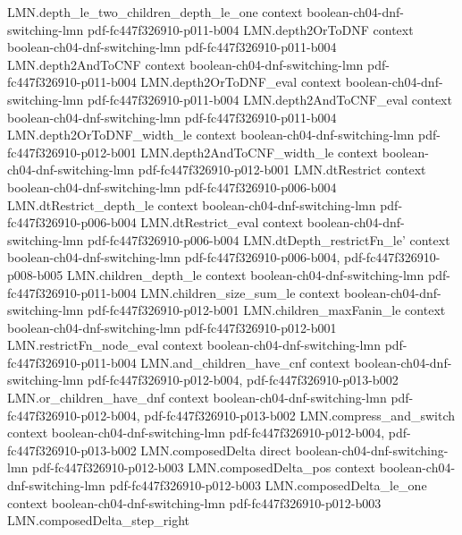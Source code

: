 \begin{theorem}
\proofstep
  {LMN.depth_le_two_children_depth_le_one}
  {context}
  {boolean-ch04-dnf-switching-lmn}
  {pdf-fc447f326910-p011-b004}
\proofstep
  {LMN.depth2OrToDNF}
  {context}
  {boolean-ch04-dnf-switching-lmn}
  {pdf-fc447f326910-p011-b004}
\proofstep
  {LMN.depth2AndToCNF}
  {context}
  {boolean-ch04-dnf-switching-lmn}
  {pdf-fc447f326910-p011-b004}
\proofstep
  {LMN.depth2OrToDNF_eval}
  {context}
  {boolean-ch04-dnf-switching-lmn}
  {pdf-fc447f326910-p011-b004}
\proofstep
  {LMN.depth2AndToCNF_eval}
  {context}
  {boolean-ch04-dnf-switching-lmn}
  {pdf-fc447f326910-p011-b004}
\proofstep
  {LMN.depth2OrToDNF_width_le}
  {context}
  {boolean-ch04-dnf-switching-lmn}
  {pdf-fc447f326910-p012-b001}
\proofstep
  {LMN.depth2AndToCNF_width_le}
  {context}
  {boolean-ch04-dnf-switching-lmn}
  {pdf-fc447f326910-p012-b001}
\proofstep
  {LMN.dtRestrict}
  {context}
  {boolean-ch04-dnf-switching-lmn}
  {pdf-fc447f326910-p006-b004}
\proofstep
  {LMN.dtRestrict_depth_le}
  {context}
  {boolean-ch04-dnf-switching-lmn}
  {pdf-fc447f326910-p006-b004}
\proofstep
  {LMN.dtRestrict_eval}
  {context}
  {boolean-ch04-dnf-switching-lmn}
  {pdf-fc447f326910-p006-b004}
\proofstep
  {LMN.dtDepth_restrictFn_le'}
  {context}
  {boolean-ch04-dnf-switching-lmn}
  {pdf-fc447f326910-p006-b004,
    pdf-fc447f326910-p008-b005}
\proofstep
  {LMN.children_depth_le}
  {context}
  {boolean-ch04-dnf-switching-lmn}
  {pdf-fc447f326910-p011-b004}
\proofstep
  {LMN.children_size_sum_le}
  {context}
  {boolean-ch04-dnf-switching-lmn}
  {pdf-fc447f326910-p012-b001}
\proofstep
  {LMN.children_maxFanin_le}
  {context}
  {boolean-ch04-dnf-switching-lmn}
  {pdf-fc447f326910-p012-b001}
\proofstep
  {LMN.restrictFn_node_eval}
  {context}
  {boolean-ch04-dnf-switching-lmn}
  {pdf-fc447f326910-p011-b004}
\proofstep
  {LMN.and_children_have_cnf}
  {context}
  {boolean-ch04-dnf-switching-lmn}
  {pdf-fc447f326910-p012-b004,
    pdf-fc447f326910-p013-b002}
\proofstep
  {LMN.or_children_have_dnf}
  {context}
  {boolean-ch04-dnf-switching-lmn}
  {pdf-fc447f326910-p012-b004,
    pdf-fc447f326910-p013-b002}
\proofstep
  {LMN.compress_and_switch}
  {context}
  {boolean-ch04-dnf-switching-lmn}
  {pdf-fc447f326910-p012-b004,
    pdf-fc447f326910-p013-b002}
\proofstep
  {LMN.composedDelta}
  {direct}
  {boolean-ch04-dnf-switching-lmn}
  {pdf-fc447f326910-p012-b003}
\proofstep
  {LMN.composedDelta_pos}
  {context}
  {boolean-ch04-dnf-switching-lmn}
  {pdf-fc447f326910-p012-b003}
\proofstep
  {LMN.composedDelta_le_one}
  {context}
  {boolean-ch04-dnf-switching-lmn}
  {pdf-fc447f326910-p012-b003}
\proofstep
  {LMN.composedDelta_step_right}

\end{theorem}
